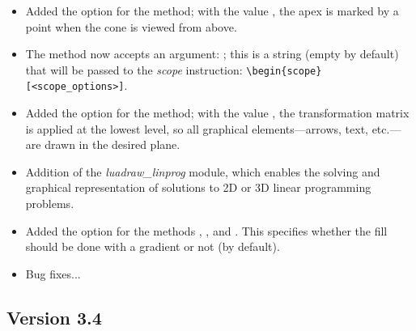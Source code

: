 \begin{itemize}
    \item Added the  option for the  method; with the value \true, the apex is marked by a point when the cone is viewed from above.

    \item The  method now accepts an argument: ; this is a string (empty by default) that will be passed to the \emph{scope} instruction: \verb|\begin{scope}[<scope_options>]|.
    
    \item Added the  option for the  method; with the value \true, the transformation matrix is ​​applied at the lowest level, so all graphical elements—arrows, text, etc.—are drawn in the desired plane.

    \item Addition of the \emph{luadraw\_linprog} module, which enables the solving and graphical representation of solutions to 2D or 3D linear programming problems.
    
    \item Added the option  for the methods , , and . This specifies whether the fill should be done with a gradient or not (\true by default).

    \item Bug fixes...
\end{itemize}

\subsection{Version 3.4}

